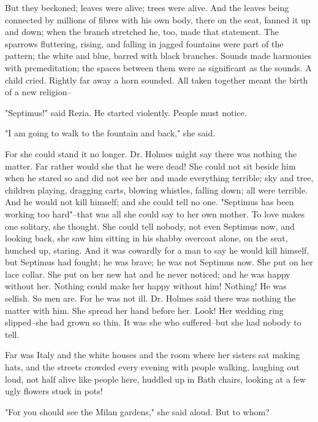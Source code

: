 \documentclass[lang=cn,10pt]{elegantbook}
\begin{document}
But they beckoned; leaves were alive; trees were alive.  And the
leaves being connected by millions of fibres with his own body,
there on the seat, fanned it up and down; when the branch stretched
he, too, made that statement.  The sparrows fluttering, rising, and
falling in jagged fountains were part of the pattern; the white and
blue, barred with black branches.  Sounds made harmonies with
premeditation; the spaces between them were as significant as the
sounds.  A child cried.  Rightly far away a horn sounded.  All
taken together meant the birth of a new religion--

"Septimus!" said Rezia.  He started violently.  People must notice.

"I am going to walk to the fountain and back," she said.

For she could stand it no longer.  Dr. Holmes might say there was
nothing the matter.  Far rather would she that he were dead!  She
could not sit beside him when he stared so and did not see her and
made everything terrible; sky and tree, children playing, dragging
carts, blowing whistles, falling down; all were terrible.  And he
would not kill himself; and she could tell no one.  "Septimus has
been working too hard"--that was all she could say to her own
mother.  To love makes one solitary, she thought.  She could tell
nobody, not even Septimus now, and looking back, she saw him
sitting in his shabby overcoat alone, on the seat, hunched up,
staring.  And it was cowardly for a man to say he would kill
himself, but Septimus had fought; he was brave; he was not Septimus
now.  She put on her lace collar.  She put on her new hat and he
never noticed; and he was happy without her.  Nothing could make
her happy without him!  Nothing!  He was selfish.  So men are.  For
he was not ill.  Dr. Holmes said there was nothing the matter with
him.  She spread her hand before her.  Look!  Her wedding ring
slipped--she had grown so thin.  It was she who suffered--but she
had nobody to tell.

Far was Italy and the white houses and the room where her sisters
sat making hats, and the streets crowded every evening with people
walking, laughing out loud, not half alive like people here,
huddled up in Bath chairs, looking at a few ugly flowers stuck in
pots!

"For you should see the Milan gardens," she said aloud.  But to
whom?
\end{document}
